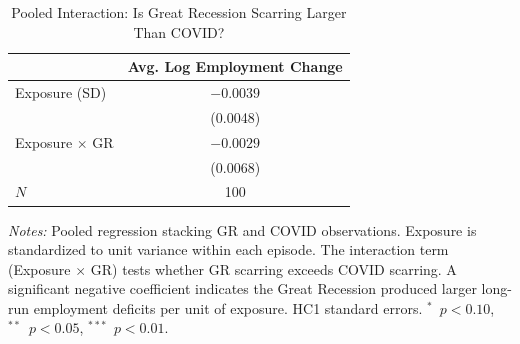 \begin{table}[H]
\centering
\caption{Pooled Interaction: Is Great Recession Scarring Larger Than COVID?}
\begin{threeparttable}
\begin{tabular}{lc}
\toprule
& Avg. Log Employment Change \\
\midrule
Exposure (SD) & $-0.0039$ \\
& (0.0048) \\
Exposure $\times$ GR & $-0.0029$ \\
& (0.0068) \\
\midrule
$N$ & 100 \\
\bottomrule
\end{tabular}
\begin{tablenotes}[flushleft]
\small
\item \textit{Notes:} Pooled regression stacking GR and COVID observations. Exposure is standardized to unit variance within each episode. The interaction term (Exposure $\times$ GR) tests whether GR scarring exceeds COVID scarring. A significant negative coefficient indicates the Great Recession produced larger long-run employment deficits per unit of exposure. HC1 standard errors. $^{*}$~$p<0.10$, $^{**}$~$p<0.05$, $^{***}$~$p<0.01$.
\end{tablenotes}
\end{threeparttable}
\label{tab:pooled}
\end{table}
